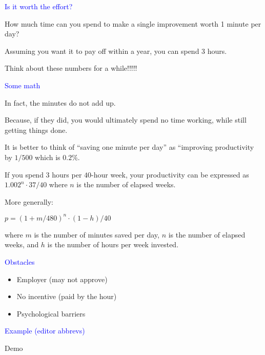 \documentclass{slides}
\newcommand{\ti}[1]{\begin{center}\Large{\textcolor{blue}{#1}}\end{center}}
\begin{document}
\begin{slide}\ti{Is it worth the effort?}

How much time can you spend to make a single improvement worth 1
minute per day?

Assuming you want it to pay off within a year, you can spend 3 hours.

Think about these numbers for a while!!!!!

\vfill\end{slide}
\begin{slide}\ti{Some math}

In fact, the minutes do not add up.

Because, if they did, you would ultimately spend no time working,
while still getting things done.

It is better to think of ``saving one minute per day'' as ``improving
productivity by $1/500$ which is $0.2\%$.

If you spend $3$ hours per $40$-hour week, your productivity can be
expressed as $1.002^n\cdot 37/40$ where $n$ is the number of elapsed
weeks.

More generally:

$p= (1+m/480)^n \cdot (1-h)/40$

where $m$ is the number of minutes saved per day, $n$ is the number of
elapsed weeks, and $h$ is the number of hours per week invested.

\vfill\end{slide}
\begin{slide}\ti{Obstacles}

  \begin{itemize}
  \item Employer (may not approve)
  \item No incentive (paid by the hour)
  \item Psychological barriers
  \end{itemize}

\vfill\end{slide}
\begin{slide}\ti{Example (editor abbrevs)}

Demo

\vfill\end{slide}
\end{document}
